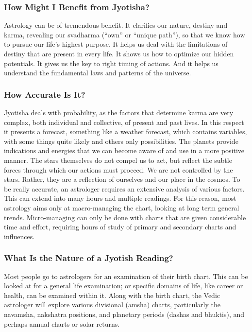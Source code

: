  

\subsubsection{How Might I Benefit from Jyotisha?}
 

Astrology can be of tremendous benefit. It clarifies our nature, destiny and karma, revealing our svadharma (“own” or “unique path”), so that we know how to pursue our life’s highest purpose. It helps us deal with the limitations of destiny that are present in every life. It shows us how to optimize our hidden potentials. It gives us the key to right timing of actions. And it helps us understand the fundamental laws and patterns of the universe.

 

\subsubsection{How Accurate Is It?}
 

Jyotisha deals with probability, as the factors that determine karma are very complex, both individual and collective, of present and past lives. In this respect it presents a forecast, something like a weather forecast, which contains variables, with some things quite likely and others only possibilities. The planets provide indications and energies that we can become aware of and use in a more positive manner. The stars themselves do not compel us to act, but reflect the subtle forces through which our actions must proceed. We are not controlled by the stars. Rather, they are a reflection of ourselves and our place in the cosmos. To be really accurate, an astrologer requires an extensive analysis of various factors. This can extend into many hours and multiple readings. For this reason, most astrology aims only at macro-managing the chart, looking at long term general trends. Micro-managing can only be done with charts that are given considerable time and effort, requiring hours of study of primary and secondary charts and influences.

 

\subsubsection{What Is the Nature of a Jyotish Reading?}
 

Most people go to astrologers for an examination of their birth chart. This can be looked at for a general life examination; or specific domains of life, like career or health, can be examined within it. Along with the birth chart, the Vedic astrologer will explore various divisional (amsha) charts, particularly the navamsha, nakshatra positions, and planetary periods (dashas and bhuktis), and perhaps annual charts or solar returns.

